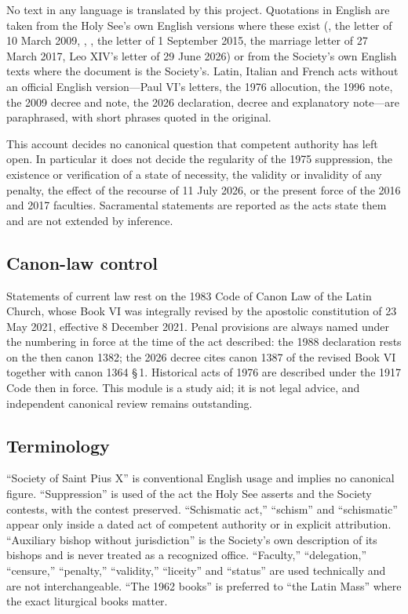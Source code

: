 No text in any language is translated by this project. Quotations in
English are taken from the Holy See's own English versions where these
exist (, the letter of 10 March 2009,
, , the letter of
1 September 2015, the marriage letter of 27 March 2017, Leo XIV's letter
of 29 June 2026) or from the Society's own English texts where the
document is the Society's. Latin, Italian and French acts without an
official English version---Paul VI's letters, the 1976 allocution, the
1996 note, the 2009 decree and note, the 2026 declaration, decree and
explanatory note---are paraphrased, with short phrases quoted in the
original.

This account decides no canonical question that competent authority has
left open. In particular it does not decide the regularity of the 1975
suppression, the existence or verification of a state of necessity, the
validity or invalidity of any penalty, the effect of the recourse of
11 July 2026, or the present force of the 2016 and 2017 faculties.
Sacramental statements are reported as the acts state them and are not
extended by inference.

\subsection{Canon-law control}

Statements of current law rest on the 1983 Code of Canon Law of the Latin
Church, whose Book VI was integrally revised by the apostolic
constitution  of 23 May 2021, effective
8 December 2021. Penal provisions are always named under the numbering in
force at the time of the act described: the 1988 declaration rests on the
then canon 1382; the 2026 decree cites canon 1387 of the revised Book VI
together with canon 1364 \S\,1. Historical acts of 1976 are described
under the 1917 Code then in force. This module is a study aid; it is not
legal advice, and independent canonical review remains outstanding.

\subsection{Terminology}

``Society of Saint Pius X'' is conventional English usage and implies no
canonical figure. ``Suppression'' is used of the act the Holy See
asserts and the Society contests, with the contest preserved.
``Schismatic act,'' ``schism'' and ``schismatic'' appear only inside a
dated act of competent authority or in explicit attribution.
``Auxiliary bishop without jurisdiction'' is the Society's own
description of its bishops and is never treated as a recognized office.
``Faculty,'' ``delegation,'' ``censure,'' ``penalty,'' ``validity,''
``liceity'' and ``status'' are used technically and are not
interchangeable. ``The 1962 books'' is preferred to ``the Latin Mass''
where the exact liturgical books matter.

